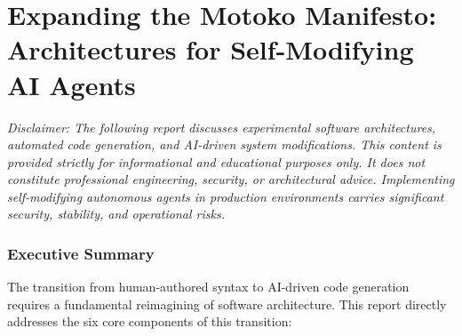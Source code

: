 \documentclass[
  11pt,
]{article}
\author{}
\date{}
\begin{document}
\hypertarget{expanding-the-motoko-manifesto-architectures-for-self-modifying-ai-agents}{%
\section{Expanding the Motoko Manifesto: Architectures for
Self-Modifying AI
Agents}\label{expanding-the-motoko-manifesto-architectures-for-self-modifying-ai-agents}}

\emph{Disclaimer: The following report discusses experimental software
architectures, automated code generation, and AI-driven system
modifications. This content is provided strictly for informational and
educational purposes only. It does not constitute professional
engineering, security, or architectural advice. Implementing
self-modifying autonomous agents in production environments carries
significant security, stability, and operational risks.}

\hypertarget{executive-summary}{%
\subsubsection{Executive Summary}\label{executive-summary}}

The transition from human-authored syntax to AI-driven code generation
requires a fundamental reimagining of software architecture. This report
directly addresses the six core components of this transition:
\end{document}
